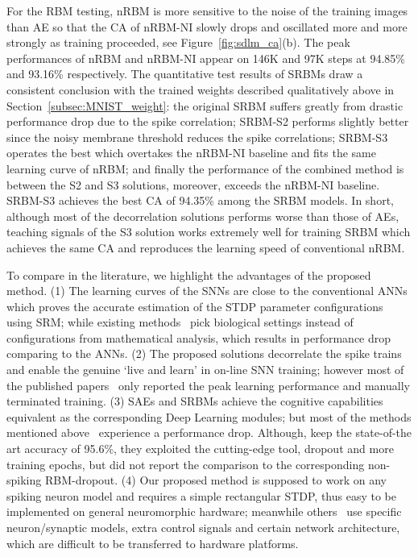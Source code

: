 For the RBM testing, nRBM is more sensitive to the noise of the training images than AE so that the CA of nRBM-NI slowly drops and oscillated more and more strongly as training proceeded, see Figure~\ref{fig:sdlm_ca}(b).
The peak performances of nRBM and nRBM-NI appear on 146K and 97K steps at 94.85\% and 93.16\% respectively. 
The quantitative test results of SRBMs draw a consistent conclusion with the trained weights described qualitatively above in Section~\ref{subsec:MNIST_weight}: the original SRBM suffers greatly from drastic performance drop due to the spike correlation; SRBM-S2 performs slightly better since the noisy membrane threshold reduces the spike correlations; SRBM-S3 operates the best which overtakes the nRBM-NI baseline and fits the same learning curve of nRBM; and finally the performance of the combined method is between the S2 and S3 solutions, moreover, exceeds the nRBM-NI baseline.
SRBM-S3 achieves the best CA of 94.35\% among the SRBM models.
In short, although most of the decorrelation solutions performs worse than those of AEs, teaching signals of the S3 solution works extremely well for training SRBM which achieves the same CA and reproduces the learning speed of conventional nRBM.

To compare in the literature, we highlight the advantages of the proposed method.
(1) The learning curves of the SNNs are close to the conventional ANNs which proves the accurate estimation of the STDP parameter configurations using SRM;
while existing methods~\citep{neil2013online,neftci2013event} pick biological settings instead of configurations from mathematical analysis, which results in performance drop comparing to the ANNs.
(2) The proposed solutions decorrelate the spike trains and enable the genuine `live and learn' in on-line SNN training;
however most of the published papers~\citep{neftci2013event,neftci2016stochastic} only reported the peak learning performance and manually terminated training. 
(3) SAEs and SRBMs achieve the cognitive capabilities equivalent as the corresponding Deep Learning modules;
but most of the methods mentioned above~\citep{neil2013online,neftci2013event} experience a performance drop.
Although, \citet{neftci2016stochastic} keep the state-of-the art accuracy of 95.6\%, they exploited the cutting-edge tool, dropout and more training epochs, but did not report the comparison to the corresponding non-spiking RBM-dropout.
(4) Our proposed method is supposed to work on any spiking neuron model and requires a simple rectangular STDP, thus easy to be implemented on general neuromorphic hardware;
meanwhile others~\citep{neftci2013event,neftci2016stochastic} use specific neuron/synaptic models, extra control signals and certain network architecture, which are difficult to be transferred to hardware platforms.
  
